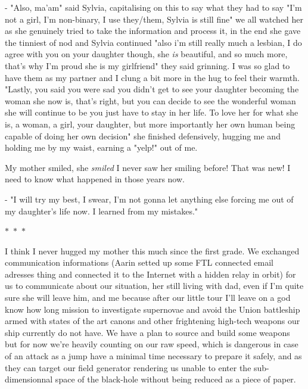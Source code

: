\documentclass[colorlinks,12pt,a4paper]{book}
\newcommand\sep{\begin{center}
  \boldmath $\ast$~$\ast$~$\ast$
\end{center}}
\begin{document}
 - "Also, ma'am" said Sylvia, capitalising on this to say what they had to say "I'm not a girl, I'm non-binary, I use they/them, Sylvia is still fine" we all 
 watched her as she genuinely tried to take the information and process it, in the end she gave the tinniest of nod and Sylvia continued "also i'm still 
 really much a lesbian, I do agree with you on your daughter though, she \textit{is} beautiful, and so much more, that's why I'm proud she is my girlfriend" they 
 said grinning. I was so glad to have them as my partner and I clung a bit more in the hug to feel their warmth.
 "Lastly, you said you were sad you didn't get to see your daughter becoming the woman she now is, that's right, but you can 
 decide to see the wonderful woman she will continue to be you just have to stay in her life. To love her for what she is, a woman, a girl,
 your daughter, but more importantly her own human being capable of doing her own decision" she finished defensively, hugging me and holding me by 
 my waist, earning a "yelp!" out of me.
 \par 
 \bigskip 
 
 My mother smiled, she \textit{smiled} I never saw her smiling before! That was new! I need to know what happened in those years now.\par 
 - "I will try my best, I swear, I'm not gonna let anything else forcing me out of my daughter's life now. I learned from my mistakes."
 
 \sep 
 
 I think I never hugged my mother this much since the first grade. We exchanged communication informations (Aarin setted up some FTL connected email adresses thing and 
 connected it to the Internet with a hidden relay in orbit) for us to communicate about our situation, her still living with dad, even if I'm
 quite sure she will leave him, and me because after our little tour I'll leave on a god know how long mission to investigate supernovae and 
 avoid the Union battleship armed with states of the art canons and other frightening high-tech weapons our ship currently do not have. We have 
 a plan to source and build some weapons but for now we're heavily counting on our raw speed, which is dangerous in case of an attack as a jump have 
 a minimal time necessary to prepare it safely, and as they can target our field generator rendering us unable to enter the sub-dimensionnal space of the 
 black-hole without being reduced as a piece of paper.\par 
 \bigskip 
 
\end{document}
